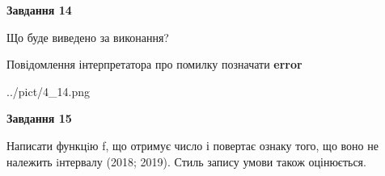 \documentclass[11pt, ukrainian]{article}
\begin{document}
{\begin {large}
{\begin {center}\textbf{Завдання 14}\end {center}}\par
Що буде виведено за виконання? \par
Повідомлення інтерпретатора про помилку позначати \textbf{error}

\begin{center}
	{../pict/4_14.png}
\end{center}
\newpage

{\begin {center}\textbf{Завдання 15}\end {center}}\par

Написати функцiю f, що отримує число і повертає ознаку того, що воно не належить iнтервалу (2018; 2019). Стиль запису умови також оцінюється.\par
\newpage

\end {large}}
\end{document}
